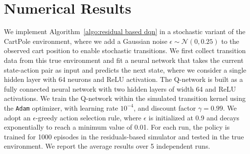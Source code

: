 \documentclass[letterpaper, 10 pt, conference]{ieeeconf}  %
\begin{document}
\section{Numerical Results}\label{sec:results}
We implement Algorithm\ \ref{algo:residual based dqn} in a stochastic variant of the CartPole environment, where we add a Gaussian noise $\epsilon\sim\mathcal N(0,0.25)$ to the observed cart position to enable stochastic transitions. We first collect transition data from this true environment and fit a neural network that takes the current state-action pair as input and predicts the next state, where we consider a single hidden layer with 64 neurons and ReLU activation. The Q-network is built as a fully connected neural network with two hidden layers of width 64 and ReLU activations. We train the Q-network within the simulated transition kernel using the \texttt{Adam} optimizer, with learning rate $10^{-4}$, and discount factor $\gamma=0.99$. We adopt an $\epsilon$-greedy action selection rule, where $\epsilon$ is initialized at 0.9 and decays exponentially to reach a minimum value of 0.01. For each run, the policy is trained for 1000 episodes in the residuals-based simulator and tested in the true environment. We report the average results over 5 independent runs.

\end{document}
